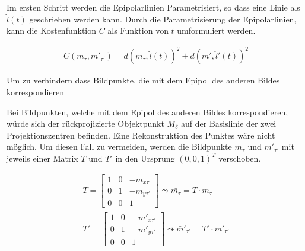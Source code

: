 Im ersten Schritt werden die Epipolarlinien Parametrisiert, so dass eine Linie als $\hat{l}(t)$ geschrieben werden kann. Durch die Parametrisierung der Epipolarlinien, kann die Kostenfunktion $C$ als Funktion von $t$ umformuliert werden.


\begin{gather}
	C(m_\tau,m'_{\tau'}) = d(m_\tau,\hat{l}(t))^2 + d(m',\hat{l}'(t))^2
\end{gather}


%

Um zu verhindern dass Bildpunkte, die mit dem Epipol des anderen Bildes korrespondieren 

Bei Bildpunkten, welche mit dem Epipol des anderen Bildes korrespondieren, würde sich der rückprojizierte Objektpunkt $M_\delta$ auf der Basislinie der zwei Projektionszentren befinden. Eine Rekonstruktion des Punktes wäre nicht möglich\cite{HZ}. Um diesen Fall zu vermeiden, werden die Bildpunkte $m_\tau$ und $m'_{\tau'} $ mit jeweils einer Matrix $T$ und $T'$ in den Ursprung $(0,0,1)^T$ verschoben.


\begin{gather}
	T = \begin{bmatrix}
	1&0&-m_{x\tau}\\
	0&1&-m_{y\tau'}\\
	0&0&1
	\end{bmatrix} \leadsto \bar{m_\tau} = T\cdot m_\tau\\
	T' = \begin{bmatrix}
	1&0&-m'_{x\tau'}\\
	0&1&-m'_{y\tau'}\\
	0&0&1
	\end{bmatrix} \leadsto 	\bar{m}'_{\tau'} = T' \cdot m'_{\tau'}
\end{gather} \\

